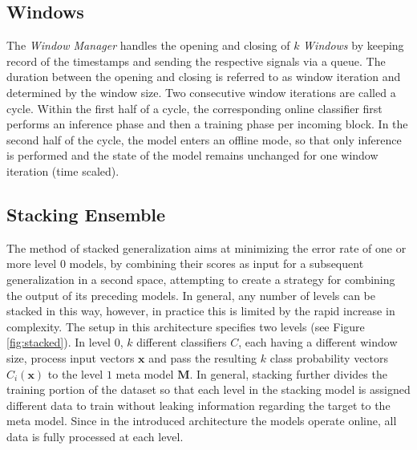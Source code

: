 \documentclass[conference]{IEEEtran}
\begin{document}
\subsection{Windows}\label{sec:windows}
The \textit{Window Manager} handles the opening and closing of $k$ \textit{Windows} by keeping record of the timestamps and sending the respective signals via a queue. The duration between the opening and closing is referred to as window iteration and determined by the window size. Two consecutive window iterations are called a cycle. Within the first half of a cycle, the corresponding online classifier first performs an inference phase and then a training phase per incoming block. In the second half of the cycle, the model enters an offline mode, so that only inference is performed and the state of the model remains unchanged for one window iteration (time scaled). 

\subsection{Stacking Ensemble}\label{sec:stacking_ensemble}
The method of stacked generalization \cite{wolpert1992stacked} aims at minimizing the error rate of one or more level $0$ models, by combining their scores as input for a subsequent generalization in a second space, attempting to create a strategy for combining the output of its preceding models. In general, any number of levels can be stacked in this way, however, in practice this is limited by the rapid increase in complexity. The setup in this architecture specifies two levels (see Figure \ref{fig:stacked}). In level $0$, $k$ different classifiers $C$, each having a different window size, process input vectors $\bm{x}$ and pass the resulting $k$ class probability vectors $C_i(\bm{x})$ to the level $1$ meta model $\bm{M}$. In general, stacking further divides the training portion of the dataset so that each level in the stacking model is assigned different data to train without leaking information regarding the target to the meta model. Since in the introduced architecture the models operate online, all data is fully processed at each level.
\end{document}
